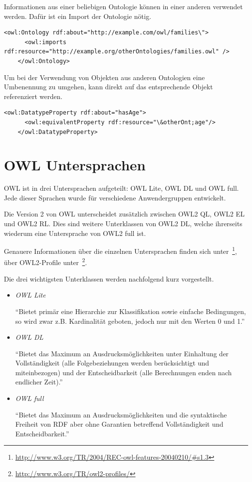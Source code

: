 Informationen aus einer beliebigen Ontologie können in einer anderen verwendet werden. Dafür ist ein Import der Ontologie nötig.

\begin{lstlisting}[caption={Beispiel eines Importes einer Ontologie}]
    <owl:Ontology rdf:about="http://example.com/owl/families\">
      <owl:imports rdf:resource="http://example.org/otherOntologies/families.owl" />
    </owl:Ontology>
\end{lstlisting}


Um bei der Verwendung von Objekten aus anderen Ontologien eine Umbenennung zu umgehen, kann direkt auf das entsprechende Objekt referenziert werden.

\begin{lstlisting}[caption={Beispiel einer Referenzierung auf ein Objekt einer externen Ontologie}]
    <owl:DatatypeProperty rdf:about="hasAge">
      <owl:equivalentProperty rdf:resource="\&otherOnt;age"/>
    </owl:DatatypeProperty>
\end{lstlisting}

\section{OWL Untersprachen}
\label{sec:owl_owl_Untersprachen}
OWL ist in drei Untersprachen aufgeteilt: OWL Lite, OWL DL und OWL full. Jede dieser Sprachen wurde für verschiedene Anwendergruppen entwickelt.

Die Version 2 von OWL unterscheidet zusätzlich zwischen OWL2 QL, OWL2 EL und OWL2 RL. Dies sind weitere Unterklassen von OWL2 DL, welche ihrerseits wiederum eine Untersprache von OWL2 full ist.

Genauere Informationen über die einzelnen Untersprachen finden sich unter~\footnote{\url{http://www.w3.org/TR/2004/REC-owl-features-20040210/\#s1.3}}, über OWL2-Profile unter~\footnote{\url{http://www.w3.org/TR/owl2-profiles/}}.

Die drei wichtigsten Unterklassen werden nachfolgend kurz vorgestellt.
\begin{itemize}
    \item \textit{OWL Lite}

        ``Bietet primär eine Hierarchie zur Klassifikation sowie einfache Bedingungen, so wird zwar z.B. 				Kardinalität geboten, jedoch nur mit den Werten 0 und 1.''~\cite[Seite 12]{projekt2Doc}

    \item{\textit{OWL DL}}

        ``Bietet das Maximum an Ausdrucksmöglichkeiten unter Einhaltung der Vollständigkeit (alle Folgebeziehungen werden berücksichtigt und miteinbezogen) und der Entscheidbarkeit (alle Berechnungen enden nach endlicher Zeit).''~\cite[Seite 12]{projekt2Doc}

    \item{\textit{OWL full}}

        ``Bietet das Maximum an Ausdrucksmöglichkeiten und die syntaktische Freiheit von RDF aber ohne Garantien betreffend Vollständigkeit und Entscheidbarkeit.''~\cite[Seite 12]{projekt2Doc}

\end{itemize}

